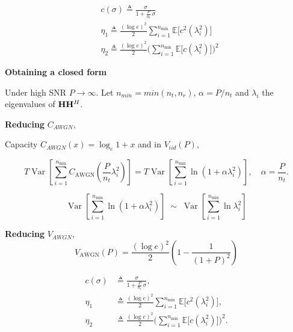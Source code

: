 \documentclass[a4paper, 12pt, onecolumn, journal, twoside, draftclsnofoot]{IEEEtran}
\begin{document}
\begin{equation*}
\begin{aligned}
& c(\sigma) \triangleq \frac{\sigma}{1 + \frac{P}{n_t} \, \sigma} \\
& \eta_1 \triangleq \frac{(\log e)^2}{2} \sum_{i=1}^{n_{\min}} \mathbb{E} \big[ c^2(\lambda_i^2) \big] \\
& \eta_2 \triangleq \frac{(\log e)^2}{2} \Bigg( \sum_{i=1}^{n_{\min}} \mathbb{E} \big[ c(\lambda_i^2) \big] \Bigg)^2
\end{aligned}
\end{equation*}


\textbf{Obtaining a closed form}

Under high SNR $P \to \infty$. Let $n_{min} = min(n_t,n_r)$, $\alpha = P/n_t$ and $\lambda_i$ the eigenvalues of ${\bf H} {\bf H}^H$.


\textbf{Reducing} $C_{AWGN}$,

Capacity $C_{AWGN}(x) = \log_e{1+x}$ and in $V_{iid}(P)$, 

\begin{equation*}
T\operatorname{Var}\left[\sum_{i=1}^{n_{\min}}C_{\mathrm{AWGN}}(\frac{P}{n_t}\lambda_i^2)\right]=T\operatorname{Var}\left[\sum_{i=1}^{n_{\min}}\ln(1+\alpha\lambda_i^2)\right],\quad\alpha=\frac{P}{n_t}.
\end{equation*}

\begin{equation*}
\operatorname{Var}\!\left[\sum_{i=1}^{n_{\min}} \ln\!\left(1+\alpha \lambda_i^2\right)\right]
\;\sim\;
\operatorname{Var}\!\left[\sum_{i=1}^{n_{\min}} \ln \lambda_i^2 \right]
\end{equation*}

\textbf{Reducing} $V_{AWGN}$, 
\begin{equation*}
V_{\mathrm{AWGN}}(P) = \frac{(\log e)^2}{2} \left( 1 - \frac{1}{(1+P)^2} \right)
\end{equation*}

\begin{equation*}
\begin{aligned}
c(\sigma) &\triangleq \frac{\sigma}{1 + \frac{P}{n_t} \, \sigma}, \\
\eta_1 &\triangleq \frac{(\log e)^2}{2} \sum_{i=1}^{n_{\min}} 
           \mathbb{E} \Big[ c^2(\lambda_i^2) \Big], \\
\eta_2 &\triangleq \frac{(\log e)^2}{2} 
           \Bigg( \sum_{i=1}^{n_{\min}} \mathbb{E} \big[ c(\lambda_i^2) \big] \Bigg)^2.
\end{aligned}
\end{equation*}
\end{document}
